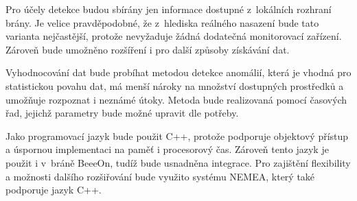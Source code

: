 Pro účely detekce budou sbírány jen informace dostupné z~lokálních rozhraní brány.
 Je velice pravděpodobné, že z~hlediska reálného nasazení bude tato varianta nejčastější, 
 protože nevyžaduje žádná dodatečná monitorovací zařízení.
 Zároveň bude umožněno rozšíření i pro další
 způsoby získávání dat. 
 
 Vyhodnocování dat bude probíhat metodou detekce anomálií, která je vhodná pro statistickou povahu dat,
 má menší nároky na množství dostupných prostředků a umožňuje rozpoznat i neznámé útoky. Metoda 
 bude realizovaná pomocí časových řad, jejichž parametry bude možné upravit dle potřeby.
 
 Jako programovací jazyk bude použit C++, protože podporuje objektový přístup a
 úspornou implementaci na paměť i procesorový čas. Zároveň tento jazyk je použit i v~bráně
 BeeeOn, tudíž bude usnadněna integrace. Pro zajištění flexibility a možnosti dalšího rozšiřování 
 bude využito systému NEMEA, který také podporuje jazyk C++. 
